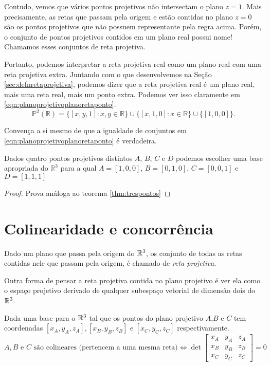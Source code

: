 Contudo, vemos que vários pontos projetivos não intersectam o plano \(z = 1\).
Mais precisamente, as retas que passam pela origem e estão contidas no plano \(z = 0\) são os pontos projetivos que não possuem representante pela regra acima.
Porém, o conjunto de pontos projetivos contidos em um plano real possui nome!
Chamamos esses conjuntos de reta projetiva.

Portanto, podemos interpretar a reta projetiva real como um plano real com uma reta projetiva extra.
Juntando com o que desenvolvemos na Seção \ref{sec:defnretaprojetiva}, podemos dizer que a reta projetiva real é um plano real, mais uma reta real, mais um ponto extra.
Podemos ver isso claramente em \ref{eqn:planoprojetivoplanoretaponto}.
\begin{equation} \label{eqn:planoprojetivoplanoretaponto}
  \mathbb{P}^2(\mathbb{R}) = \{ [x, y, 1] : x, y \in \mathbb{R} \} \cup \{[x, 1, 0] : x \in \mathbb{R}\} \cup \{[1, 0, 0]\}.
\end{equation}

\begin{exer}
  Convença a si mesmo de que a igualdade de conjuntos em \ref{eqn:planoprojetivoplanoretaponto} é verdadeira.
\end{exer}

\begin{thm} \label{thm:quatropontos}
  Dados quatro pontos projetivos distintos \(A\), \(B\), \(C\) e \(D\) podemos escolher uma base apropriada do \(\mathbb{R}^3\) para a qual \(A = [1, 0, 0]\),  \(B = [0, 1, 0]\), \(C = [0, 0, 1]\) e \( D = [1, 1, 1]\)
\end{thm}
\begin{proof}
Prova análoga ao teorema \ref{thm:trespontos} 
\end{proof}
\section{Colinearidade e concorrência}
\begin{defn}
Dado um plano que passa pela origem do $\mathbb{R}^3$, os conjunto de todas as retas contidas nele que passam pela origem, é chamado de \emph{reta projetiva}.
\end{defn}

Outra forma de pensar a reta projetiva contida no plano projetivo é ver ela como o espaço projetivo derivado de qualquer subespaço vetorial de dimensão dois do $\mathbb{R}^3$.

\begin{thm}
Dada uma base para o $\mathbb{R}^3$ tal que os pontos do plano projetivo $A$,$B$ e $C$ tem coordenadas $[x_A,y_A,z_A], [x_B,y_B,z_B]$ e $[x_C,y_C,z_C]$ respectivamente. 
\[A,B \text{ e } C \text{ são colineares (pertencem a uma mesma reta)} \iff \det \begin{bmatrix} x_A & y_A & z_A \\ x_B & y_B & z_B \\ x_C & y_C & z_C \end{bmatrix} = 0\]
\end{thm}

